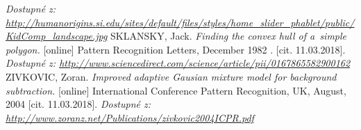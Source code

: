 \begin{thebibliography}{99}
	 \textit{Dostupné z: \url{http://humanorigins.si.edu/sites/default/files/styles/home_slider_phablet/public/KidComp_landscape.jpg}}
	SKLANSKY, Jack. \textit{Finding the convex hull of a~simple polygon.} [online] Pattern Recognition Letters, December 1982 . [cit. 11.03.2018].
		\textit{Dostupné z: \url{http://www.sciencedirect.com/science/article/pii/0167865582900162}}
	ZIVKOVIC, Zoran. \textit{Improved adaptive Gausian mixture model for background subtraction.} [online] International Conference Pattern Recognition, UK, August, 2004 [cit. 11.03.2018].
		\textit{Dostupné z: \url{http://www.zoranz.net/Publications/zivkovic2004ICPR.pdf}}

\end{thebibliography}
